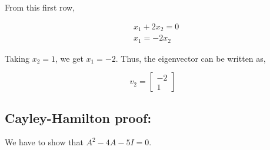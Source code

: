 \documentclass{article}
\begin{document}
    \vspace{10pt}
    From this first row,
    
    \[
    \begin{aligned}
        & x_1 + 2x_2 = 0 \\
        & x_1 = -2x_2
    \end{aligned}
    \]
    
    Taking \(x_2 = 1\), we get \(x_1 = -2\). Thus, the eigenvector can be written as,
    
    \[
    v_2 = \begin{bmatrix}
        -2 \\
        1
    \end{bmatrix}
    \]
    
    \subsection*{Cayley-Hamilton proof: }
    We have to show that \( A^2 - 4A - 5I = 0 \).

    
\end{document}
